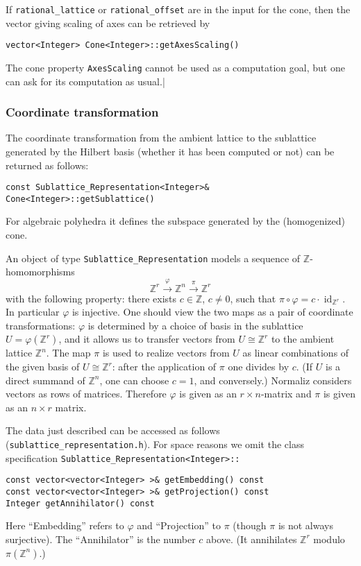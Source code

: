 \documentclass[12pt,a4paper]{scrartcl}
\theoremstyle{definition}
\let\phi=\varphi
\def\ZZ{{\mathbb Z}}
\begin{document}
\begin{small}
If \verb|rational_lattice| or \verb|rational_offset| are in the input for the cone, then the vector giving scaling of axes can be retrieved by
\begin{Verbatim}
vector<Integer> Cone<Integer>::getAxesScaling() 
\end{Verbatim}
The cone property \verb|AxesScaling| cannot be used as a computation goal, but one can ask for its computation as usual.|

\subsubsection{Coordinate transformation}\label{coord}

The coordinate transformation from the ambient lattice to the sublattice generated by the Hilbert basis (whether it has been computed or not) can be returned as follows:
\begin{Verbatim}
const Sublattice_Representation<Integer>& Cone<Integer>::getSublattice()
\end{Verbatim}
For algebraic polyhedra it defines the subspace generated by the (homogenized) cone.

An object of type \verb|Sublattice_Representation| models a sequence of $\ZZ$-homomorphisms
$$
\ZZ^r\xrightarrow{\phi}\ZZ^n\xrightarrow{\pi}\ZZ^r
$$
with the following property: there exists $c\in\ZZ$, $c\neq 0$, such that $\pi\circ \phi=c\cdot\operatorname{id}_{\ZZ^r}$. In particular $\phi$ is injective. One should view the two maps as a pair of coordinate transformations: $\phi$ is determined by a choice of basis in the sublattice $U=\phi(\ZZ^r)$, and it allows us to transfer vectors from $U\cong \ZZ^r$ to the ambient lattice $\ZZ^n$. The map $\pi$ is used to realize vectors from $U$ as linear combinations of the given basis of $U\cong\ZZ^r$: after the application of $\pi$ one divides by $c$. (If $U$ is a direct summand of $\ZZ^n$, one can choose $c=1$, and conversely.) Normaliz considers vectors as rows of matrices. Therefore $\phi$ is given as an $r\times n$-matrix and $\pi$ is given as an $n\times r$ matrix.

The data just described can be accessed as follows (\verb|sublattice_representation.h|). For space reasons we omit the class specification \verb|Sublattice_Representation<Integer>::|
\begin{Verbatim}
const vector<vector<Integer> >& getEmbedding() const
const vector<vector<Integer> >& getProjection() const
Integer getAnnihilator() const
\end{Verbatim}
Here ``Embedding'' refers to $\phi$ and ``Projection'' to $\pi$ (though $\pi$ is not always surjective). The ``Annihilator'' is the number $c$ above. (It annihilates $\ZZ^r$ modulo $\pi(\ZZ^n)$.)


\end{small}
\end{document}
